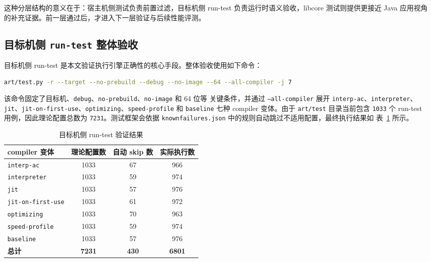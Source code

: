 这种分层结构的意义在于：宿主机侧测试负责前置过滤，目标机侧 run-test 负责运行时语义验收，libcore 测试则提供更接近 Java 应用视角的补充证据。前一层通过后，才进入下一层验证与后续性能评测。

\subsection{\texorpdfstring{目标机侧 \texttt{run-test} 整体验收}{目标机侧 run-test 整体验收}}

目标机侧 run-test 是本文验证执行引擎正确性的核心手段。整体验收使用如下命令：
\begin{lstlisting}[language=bash,basicstyle=\ttfamily\small]
art/test.py -r --target --no-prebuild --debug --no-image --64 --all-compiler -j 7
\end{lstlisting}

该命令固定了目标机、\texttt{debug}、\texttt{no-prebuild}、\texttt{no-image} 和 64 位等
关键条件，并通过 \texttt{--all-compiler} 展开 \texttt{interp-ac}、\texttt{interpreter}、
\texttt{jit}、\texttt{jit-on-first-use}、\texttt{optimizing}、\texttt{speed-profile}
和 \texttt{baseline} 七种 compiler 变体。由于 \texttt{art/test} 目录当前包含
\texttt{1033} 个 run-test 用例，因此理论配置总数为 \texttt{7231}。测试框架会依据
\texttt{knownfailures.json} 中的规则自动跳过不适用配置，最终执行结果如
表~\ref{tab:target-run-test-result} 所示。

\begin{table}[htbp]
    \centering
    \caption{目标机侧 run-test 验证结果}
    \label{tab:target-run-test-result}
    \begin{tabular}{lccc}
        \hline
        \textbf{compiler 变体} & \textbf{理论配置数} & \textbf{自动 skip 数} & \textbf{实际执行数} \\
        \hline
        \texttt{interp-ac} & 1033 & 67 & 966 \\
        \texttt{interpreter} & 1033 & 59 & 974 \\
        \texttt{jit} & 1033 & 57 & 976 \\
        \texttt{jit-on-first-use} & 1033 & 61 & 972 \\
        \texttt{optimizing} & 1033 & 70 & 963 \\
        \texttt{speed-profile} & 1033 & 59 & 974 \\
        \texttt{baseline} & 1033 & 57 & 976 \\
        \hline
        \textbf{总计} & \textbf{7231} & \textbf{430} & \textbf{6801} \\
        \hline
    \end{tabular}
\end{table}

